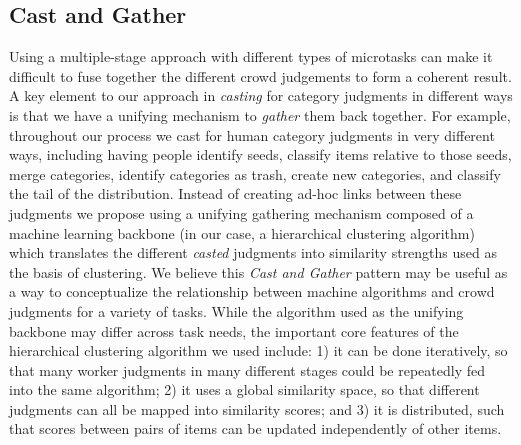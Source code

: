 \subsection{Cast and Gather}
Using a multiple-stage approach with different types of microtasks
can make it difficult to fuse together the different crowd judgements to form
a coherent result.
A key element to our approach in \textit{casting} for category judgments in
different ways is that we have a unifying mechanism to \textit{gather} them back
together.  For example, throughout our process we cast for human category
judgments in very different ways, including having people identify seeds,
classify items relative to those seeds, merge categories, identify categories
as trash, create new categories, and classify the tail of the distribution.
Instead of creating ad-hoc links between these judgments we propose
using a unifying gathering mechanism composed of a machine learning backbone
(in our case, a hierarchical clustering algorithm) which translates the
different \textit{casted} judgments into similarity strengths used as the basis of
clustering.   We believe this \textit{Cast and Gather} pattern may be useful as a
way to conceptualize the relationship between machine algorithms and crowd
judgments for a variety of tasks. While the algorithm used as the unifying
backbone may differ across task needs, the important core features of the hierarchical
clustering algorithm we used include: 1) it can
be done iteratively, so that many worker judgments in many different stages
could be repeatedly fed into the same algorithm; 2) it uses a global similarity
space, so that different judgments can all be mapped into similarity scores;
and 3) it is distributed, such that scores between pairs of items can be
updated independently of other items.


